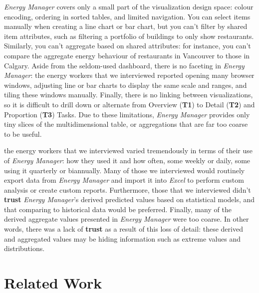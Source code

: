 \documentclass[journal]{vgtc}                %
\newcommand{\bstart}[1]{\vspace{1mm} \noindent{\textbf{#1:}}}
\begin{document}
{\it Energy Manager} covers only a small part of the visualization design space: colour encoding, ordering in sorted tables, and limited navigation.
You can select items manually when creating a line chart or bar chart, but you can't filter by shared item attributes, such as filtering a portfolio of buildings to only show restaurants.
Similarly, you can't aggregate based on shared attributes: for instance, you can't compare the aggregate energy behaviour of restaurants in Vancouver to those in Calgary.
Aside from the seldom-used dashboard, there is no faceting in {\it Energy Manager}: the energy workers that we interviewed reported opening many browser windows, adjusting line or bar charts to display the same scale and ranges, and tiling these windows manually.
Finally, there is no linking between visualizations, so it is difficult to drill down or alternate from Overview ({\bf T1}) to Detail ({\bf T2}) and Proportion ({\bf T3}) Tasks.
Due to these limitations, {\it Energy Manager} provides only tiny slices of the multidimensional table, or aggregations that are far too coarse to be useful.

\bstart{Interview observations} the energy workers that we interviewed varied tremendously in terms of their use of {\it Energy Manager}: how they used it and how often, some weekly or daily, some using it quarterly or biannually.
Many of those we interviewed would routinely export data from {\it Energy Manager} and import it into {\it Excel} to perform custom analysis or create custom reports.
Furthermore, those that we interviewed didn't {\bf trust} {\it Energy Manager}'s derived predicted values based on statistical models, and that comparing to historical data would be preferred.
Finally, many of the derived aggregate values presented in {\it Energy Manager} were too coarse. In other words, there was a lack of {\bf trust} as a result of this loss of detail: these derived and aggregated values may be hiding information such as extreme values and distributions.


\section{Related Work}
\label{related-work}

\end{document}
